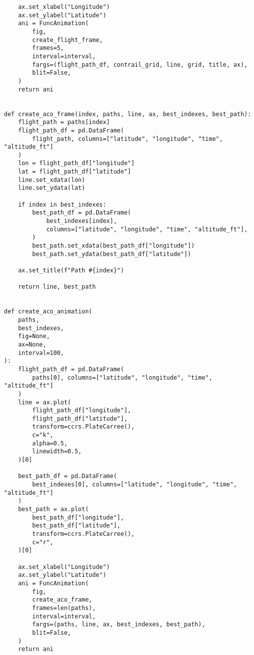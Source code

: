 \begin{verbatim}
    ax.set_xlabel("Longitude")
    ax.set_ylabel("Latitude")
    ani = FuncAnimation(
        fig,
        create_flight_frame,
        frames=5,
        interval=interval,
        fargs=(flight_path_df, contrail_grid, line, grid, title, ax),
        blit=False,
    )
    return ani


def create_aco_frame(index, paths, line, ax, best_indexes, best_path):
    flight_path = paths[index]
    flight_path_df = pd.DataFrame(
        flight_path, columns=["latitude", "longitude", "time", "altitude_ft"]
    )
    lon = flight_path_df["longitude"]
    lat = flight_path_df["latitude"]
    line.set_xdata(lon)
    line.set_ydata(lat)

    if index in best_indexes:
        best_path_df = pd.DataFrame(
            best_indexes[index],
            columns=["latitude", "longitude", "time", "altitude_ft"],
        )
        best_path.set_xdata(best_path_df["longitude"])
        best_path.set_ydata(best_path_df["latitude"])

    ax.set_title(f"Path #{index}")

    return line, best_path


def create_aco_animation(
    paths,
    best_indexes,
    fig=None,
    ax=None,
    interval=100,
):
    flight_path_df = pd.DataFrame(
        paths[0], columns=["latitude", "longitude", "time", "altitude_ft"]
    )
    line = ax.plot(
        flight_path_df["longitude"],
        flight_path_df["latitude"],
        transform=ccrs.PlateCarree(),
        c="k",
        alpha=0.5,
        linewidth=0.5,
    )[0]

    best_path_df = pd.DataFrame(
        best_indexes[0], columns=["latitude", "longitude", "time", "altitude_ft"]
    )
    best_path = ax.plot(
        best_path_df["longitude"],
        best_path_df["latitude"],
        transform=ccrs.PlateCarree(),
        c="r",
    )[0]

    ax.set_xlabel("Longitude")
    ax.set_ylabel("Latitude")
    ani = FuncAnimation(
        fig,
        create_aco_frame,
        frames=len(paths),
        interval=interval,
        fargs=(paths, line, ax, best_indexes, best_path),
        blit=False,
    )
    return ani

\end{verbatim}
